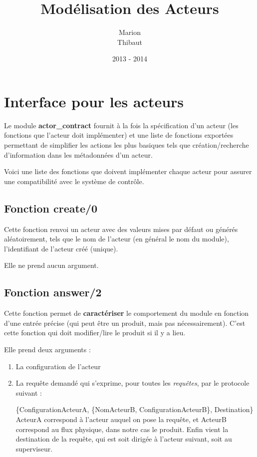 \documentclass[12pt,a4paper]{article}
\title{\textbf{Modélisation des Acteurs}}
\author{Marion \familyname{Ly} \\ Thibaut \familyname{Smith}}
\date{2013 - 2014}
\begin{document}
	\maketitle

	\section{Interface pour les acteurs}

	Le module \textbf{actor\_contract} fournit à la fois la spécification d'un 
	acteur (les fonctions que l'acteur doit implémenter) et une liste de 
	fonctions exportées permettant de simplifier les actions les plus basiques 
	tels que création/recherche d'information dans les métadonnées d'un acteur.

	Voici une liste des fonctions que doivent implémenter chaque acteur pour 
	assurer une compatibilité avec le système de contrôle. 


	\subsection*{Fonction create/0}
		Cette fonction renvoi un acteur avec des valeurs mises par défaut ou
		générés aléatoirement, tels que le nom de l'acteur (en général le nom
		du module), l'identifiant de l'acteur créé (unique).

		Elle ne prend aucun argument.

	\subsection*{Fonction answer/2}
	
		Cette fonction permet de \textbf{caractériser} le comportement du 
		module en fonction d'une entrée précise (qui peut être un produit, mais
		pas nécessairement). C'est cette fonction qui doit modifier/lire le 
		produit si il y a lieu.

		Elle prend deux arguments :

		\begin{enumerate}
			\item La configuration de l'acteur
			\item La requête demandé qui s'exprime, pour toutes les 
			\textit{requêtes}, par le protocole suivant :

				\{ConfigurationActeurA, 
				\{NomActeurB, ConfigurationActeurB\},
				 Destination\}
				ActeurA correspond à l'acteur auquel on pose la requête, et 
				ActeurB correspond au flux physique, dans notre cas le produit.
				Enfin vient la destination de la requête, qui est soit dirigée
				à l'acteur suivant, soit au superviseur.
		\end{enumerate}
\end{document}
